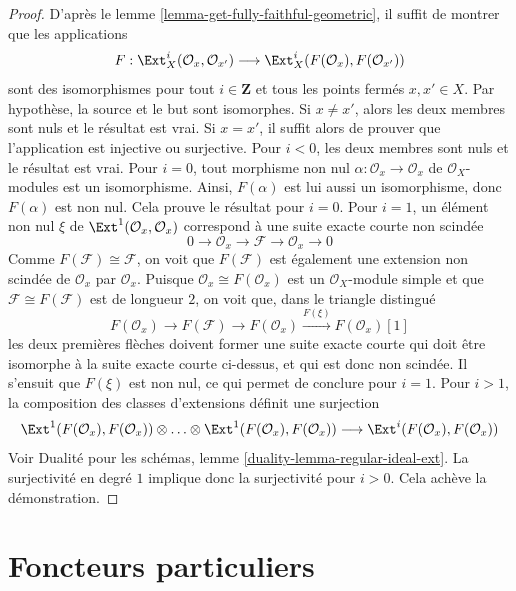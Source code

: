 \begin{proof}
D'après le lemme \ref{lemma-get-fully-faithful-geometric}, il suffit de montrer
que les applications
$$
F : \Ext^i_X(\mathcal{O}_x, \mathcal{O}_{x'})
\longrightarrow
\Ext^i_X(F(\mathcal{O}_x), F(\mathcal{O}_{x'}))
$$
sont des isomorphismes pour tout $i \in \mathbf{Z}$ et tous les points fermés
$x, x' \in X$. Par hypothèse, la source et le but sont isomorphes.
Si $x \not = x'$, alors les deux membres sont nuls et le résultat est vrai.
Si $x = x'$, il suffit alors de prouver que l'application est injective
ou surjective. Pour $i < 0$, les deux membres sont nuls et le résultat est vrai.
Pour $i = 0$, tout morphisme non nul $\alpha : \mathcal{O}_x \to \mathcal{O}_x$ de
$\mathcal{O}_X$-modules est un isomorphisme. Ainsi, $F(\alpha)$ est lui aussi un
isomorphisme, donc $F(\alpha)$ est non nul. Cela prouve le résultat pour $i = 0$.
Pour $i = 1$, un élément non nul $\xi$ de $\Ext^1(\mathcal{O}_x, \mathcal{O}_x)$
correspond à une suite exacte courte non scindée
$$
0 \to \mathcal{O}_x \to \mathcal{F} \to \mathcal{O}_x \to 0
$$
Comme $F(\mathcal{F}) \cong \mathcal{F}$, on voit que $F(\mathcal{F})$
est également une extension non scindée de $\mathcal{O}_x$ par $\mathcal{O}_x$.
Puisque $\mathcal{O}_x \cong F(\mathcal{O}_x)$ est un
$\mathcal{O}_X$-module simple et que $\mathcal{F} \cong F(\mathcal{F})$ est de
longueur $2$, on voit que, dans le triangle distingué
$$
F(\mathcal{O}_x) \to F(\mathcal{F}) \to F(\mathcal{O}_x)
\xrightarrow{F(\xi)} F(\mathcal{O}_x)[1]
$$
les deux premières flèches doivent former une suite exacte courte qui doit être
isomorphe à la suite exacte courte ci-dessus, et qui est donc non scindée.
Il s'ensuit que $F(\xi)$ est non nul, ce qui permet de conclure pour $i = 1$.
Pour $i > 1$, la composition des classes d'extensions définit une surjection
$$
\Ext^1(F(\mathcal{O}_x), F(\mathcal{O}_x)) \otimes \ldots \otimes
\Ext^1(F(\mathcal{O}_x), F(\mathcal{O}_x))
\longrightarrow
\Ext^i(F(\mathcal{O}_x), F(\mathcal{O}_x))
$$
Voir Dualité pour les schémas, lemme \ref{duality-lemma-regular-ideal-ext}.
La surjectivité en degré $1$ implique donc la surjectivité pour $i > 0$.
Cela achève la démonstration.
\end{proof}










\section{Foncteurs particuliers}
\label{section-special-functors}

